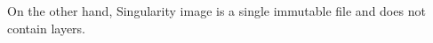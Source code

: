 \documentclass[a4paper,num-refs]{oup-contemporary}
\begin{document}
On the other hand, Singularity image is a single immutable file and 
does not contain layers.

\end{document}
